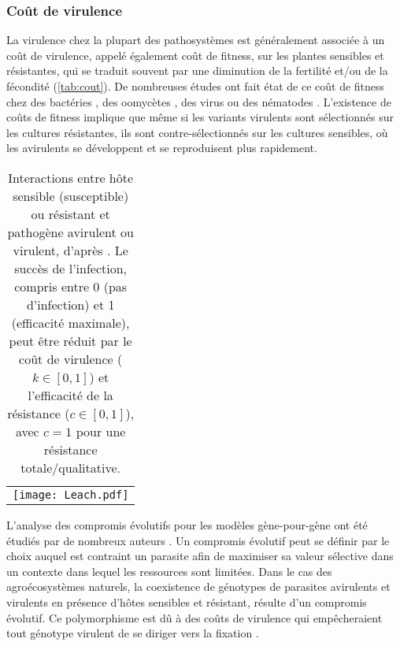 \subsubsection*{Coût de virulence}

	La virulence chez la plupart des pathosystèmes est généralement associée à un coût de virulence, appelé également coût de fitness, sur les plantes sensibles et résistantes, qui se traduit souvent par une diminution de la fertilité et/ou de la fécondité \citep{Laine2013, Brown2003} (\autoref{tab:cout}). 
De nombreuses études ont fait état de ce coût de fitness chez des bactéries \citep{Cruz2000, Leach2001}, des oomycètes \citep{Montarry2010}, des virus \citep{Garcia-Arenal2013}
 ou des nématodes \citep{Castagnone-Sereno2002, Castagnone-Sereno2007, Djian-Caporalino2011}. L'existence de coûts de fitness implique que même si les variants virulents sont
sélectionnés sur les cultures résistantes, ils sont  contre-sélectionnés sur les cultures sensibles, où les avirulents  se développent et se reproduisent plus rapidement.

 \begin{table}[ht]
  \centering
   \caption[Interactions entre hôte sensible ou résistant et pathogène avirulent ou virulent, d'après    
          \citet{Leonard1977, Leach2001}]{Interactions entre hôte sensible (susceptible) ou résistant et pathogène  
          avirulent ou virulent, d'après \citet{Leonard1977, Leach2001}. Le succès de l'infection, compris entre 0 (pas 
          d'infection) et 1 (efficacité maximale), peut être réduit par le coût de virulence ($k\in[0,1]$) et 
          l'efficacité de la résistance ($c\in[0,1]$), avec $c=1$ pour une résistance totale/qualitative.}
   \label{tab:cout}
		  \begin{tabular}{c}
		  \texttt{[image: Leach.pdf]}
		  \end{tabular}
 \end{table}

	L’analyse  des compromis évolutifs pour les modèles gène-pour-gène ont été étudiés par de nombreux auteurs  \citep{Leonard1977, Tellier2007, Brown2015}. Un compromis évolutif peut se définir par  le  choix auquel est contraint un parasite afin de maximiser sa  valeur sélective dans un contexte dans lequel les ressources sont limitées. 
Dans le cas des agroécosystèmes naturels, la coexistence de génotypes de parasites avirulents et virulents en présence d'hôtes sensibles et résistant, résulte d'un compromis évolutif. Ce polymorphisme est dû à des coûts  de virulence qui empêcheraient tout génotype virulent de se diriger vers la fixation \citep{Laine2013}. 


